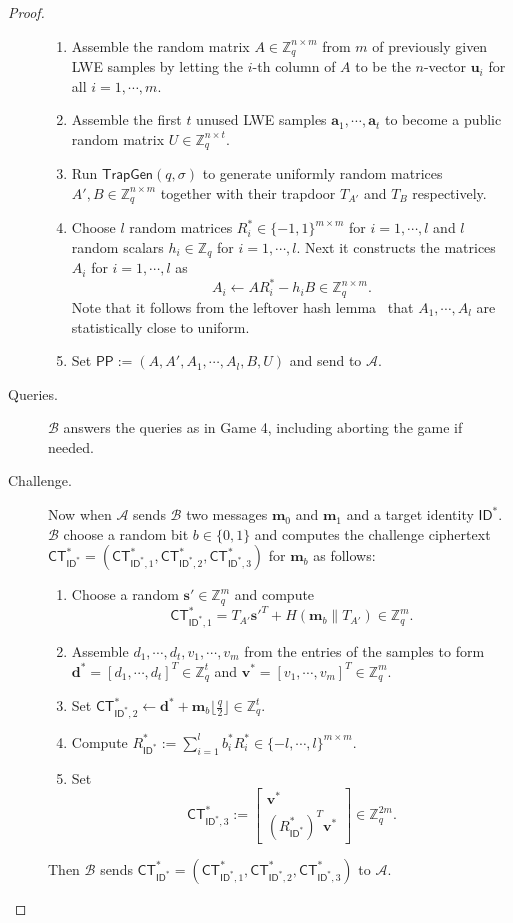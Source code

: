 \documentclass[runningheads]{llncs}
\def\ZZ{\mathbb{Z}}
\def\cal{\mathcal}
\def\bf{\mathbf}
\def\TrapGen{\mathsf{TrapGen}}
\def\PP{\mathsf{PP}}
\def\CT{\mathsf{CT}}
\def\u{\bf{u}}
\def\v{\bf{v}}
\def\d{\bf{d}}
\def\ID{\mathsf{ID}}
\begin{document}
\begin{proof}
\begin{description}
\begin{enumerate}
\item Assemble the random matrix $A\in\ZZ_q^{n\times m}$ from $m$ of previously given LWE samples by letting the $i$-th column of $A$ to be the $n$-vector $\u_i$ for all $i=1,\cdots,m$.
\item Assemble the first $t$ unused  LWE samples $\bf{a}_1,\cdots,\bf{a}_t$ to become a public random matrix $U\in\ZZ_q^{n\times t}$.
\item Run $\TrapGen(q,\sigma)$ to generate uniformly random matrices $A', B\in\ZZ_q^{n\times m}$ together with their trapdoor $T_{A'}$ and $T_B$ respectively.
\item Choose  $l$ random matrices $R^*_i\in\{-1,1\}^{m\times m}$ for $i=1,\cdots,l$ and $l$ random scalars $h_i\in\ZZ_q$ for $i=1,\cdots,l$. Next it constructs the matrices $A_i$ for $i=1,\cdots,l$ as
$$A_i\gets AR^*_i-h_iB\in\ZZ_q^{n\times m}.$$
Note that it follows from the leftover hash lemma~{\cite[Theorem 8.38]{Shoup}}  that $A_1,\cdots,A_l$ are statistically close to uniform.
\item Set $\PP:=(A,A',A_1,\cdots,A_l,B,U)$ and send to $\cal{A}$.
\end{enumerate}
\item[Queries.] $\cal{B}$ answers the queries as in Game 4, including aborting the game if needed.    
\item[Challenge.]    
Now when $\cal{A}$ sends $\cal{B}$ two messages $\bf{m}_0$ and $\bf{m}_1$ and a target identity $\ID^*$. $\cal{B}$ choose a random bit $b\in\{0,1\}$ and computes the challenge ciphertext  $\CT^*_{\ID^*}=(\CT^*_{\ID^*,1},\CT^*_{\ID^*,2},\CT^*_{\ID^*,3})$ for $\bf{m}_b$ as follows:
\begin{enumerate}
\item Choose a random $\bf{s}'\in\ZZ_q^m$ and compute
$$\CT^*_{\ID^*,1}=T_{A'}\bf{s}'^T+H(\bf{m}_b\|T_{A'})\in\ZZ_q^m.$$
\item Assemble $d_1,\cdots,d_t,v_1,\cdots,v_m$ from the entries of the samples to form $\d^*=[d_1,\cdots,d_t]^T\in\ZZ_q^t$ and $\v^*=[v_1,\cdots,v_m]^T\in\ZZ_q^m$.
\item Set $\CT^*_{\ID^*,2}\gets\d^*+\bf{m}_b\lfloor\frac{q}{2}\rfloor\in\ZZ_q^t$.
\item Compute $R^*_{\ID^*}:=\sum_{i=1}^lb_i^*R_i^*\in\{-l,\cdots,l\}^{m\times m}$.
\item Set
$$\CT^*_{\ID^*,3}:=\left[
\begin{array}{c}
\v^* \\
(R^*_{\ID^*})^T\v^*
\end{array}
\right] \in\ZZ_q^{2m}.$$
\end{enumerate}
Then $\cal{B}$ sends $\CT^*_{\ID^*}=(\CT^*_{\ID^*,1},\CT^*_{\ID^*,2},\CT^*_{\ID^*,3})$ to $\cal{A}$.


\end{description}
\end{proof}
\end{document}
